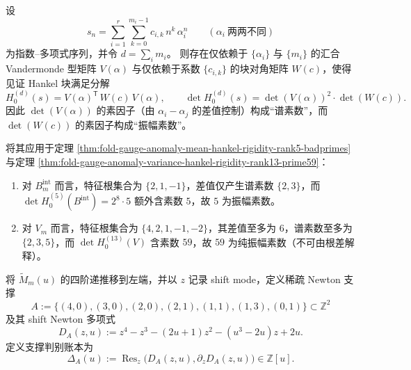 \begin{corollary}\label{cor:fold-gauge-anomaly-spectral-vs-amplitude-primes}
设
\[
s_n=\sum_{i=1}^{r}\sum_{k=0}^{m_i-1}c_{i,k}\,n^k\,\alpha_i^n
\qquad(\alpha_i\ \text{两两不同})
\]
为指数--多项式序列，并令 \(d=\sum_i m_i\)。
则存在仅依赖于 \(\{\alpha_i\}\) 与 \(\{m_i\}\) 的汇合 Vandermonde 型矩阵 \(V(\alpha)\) 与仅依赖于系数 \(\{c_{i,k}\}\) 的块对角矩阵 \(W(c)\)，使得见证 Hankel 块满足分解
\[
H^{(d)}_{0}(s)=V(\alpha)^{\mathsf T}\,W(c)\,V(\alpha),
\qquad
\det H^{(d)}_{0}(s)=\det(V(\alpha))^{2}\cdot \det(W(c)).
\]
因此 \(\det(V(\alpha))\) 的素因子（由 \(\alpha_i-\alpha_j\) 的差值控制）构成“谱素数”，而 \(\det(W(c))\) 的素因子构成“振幅素数”。
\par
将其应用于定理 \ref{thm:fold-gauge-anomaly-mean-hankel-rigidity-rank5-badprimes} 与定理 \ref{thm:fold-gauge-anomaly-variance-hankel-rigidity-rank13-prime59}：
\begin{enumerate}
  \item 对 \(B_m^{\mathrm{int}}\) 而言，特征根集合为 \(\{2,1,-1\}\)，差值仅产生谱素数 \(\{2,3\}\)，而 \(\det H^{(5)}_0(B^{\mathrm{int}})=2^{8}\cdot 5\) 额外含素数 \(5\)，故 \(5\) 为振幅素数。
  \item 对 \(V_m\) 而言，特征根集合为 \(\{4,2,1,-1,-2\}\)，其差值至多为 \(6\)，谱素数至多为 \(\{2,3,5\}\)，而 \(\det H^{(13)}_0(V)\) 含素数 \(59\)，故 \(59\) 为纯振幅素数（不可由根差解释）。
\end{enumerate}
\end{corollary}
\begin{definition}\label{def:distill-khovanskii-gauge-shift-newton-denominator}
将 \(\widetilde M_m(u)\) 的四阶递推移到左端，并以 \(z\) 记录 shift mode，定义稀疏 Newton 支撑
\[
A:=\{(4,0),(3,0),(2,0),(2,1),(1,1),(1,3),(0,1)\}\subset\mathbb Z^2
\]
及其 shift Newton 多项式
\[
D_A(z,u):=z^4-z^3-(2u+1)z^2-(u^3-2u)z+2u.
\]
定义支撑判别账本为
\[
\Delta_A(u):=\operatorname{Res}_z\bigl(D_A(z,u),\partial_zD_A(z,u)\bigr)\in\mathbb Z[u].
\]
\end{definition}


